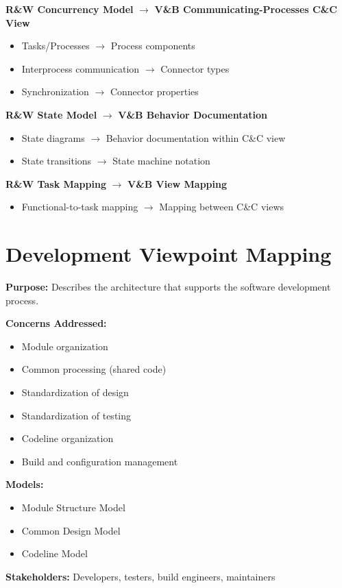 \documentclass[11pt]{article}
\begin{document}
\begin{mappingbox}

\textbf{R\&W Concurrency Model} $\rightarrow$ \textbf{V\&B Communicating-Processes C\&C View}
\begin{itemize}[nosep]
    \item Tasks/Processes $\rightarrow$ Process components
    \item Interprocess communication $\rightarrow$ Connector types
    \item Synchronization $\rightarrow$ Connector properties
\end{itemize}

\textbf{R\&W State Model} $\rightarrow$ \textbf{V\&B Behavior Documentation}
\begin{itemize}[nosep]
    \item State diagrams $\rightarrow$ Behavior documentation within C\&C view
    \item State transitions $\rightarrow$ State machine notation
\end{itemize}

\textbf{R\&W Task Mapping} $\rightarrow$ \textbf{V\&B View Mapping}
\begin{itemize}[nosep]
    \item Functional-to-task mapping $\rightarrow$ Mapping between C\&C views
\end{itemize}
\end{mappingbox}

\section{Development Viewpoint Mapping}

\begin{rwbox}
\textbf{Purpose:} Describes the architecture that supports the software development process.

\textbf{Concerns Addressed:}
\begin{itemize}[nosep]
    \item Module organization
    \item Common processing (shared code)
    \item Standardization of design
    \item Standardization of testing
    \item Codeline organization
    \item Build and configuration management
\end{itemize}

\textbf{Models:}
\begin{itemize}[nosep]
    \item Module Structure Model
    \item Common Design Model
    \item Codeline Model
\end{itemize}

\textbf{Stakeholders:} Developers, testers, build engineers, maintainers
\end{rwbox}
\end{document}
